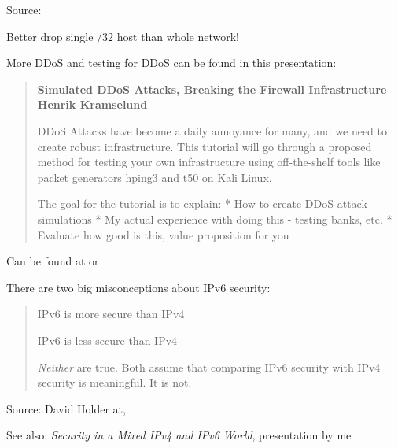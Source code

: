 \documentclass[Screen16to9,17pt]{foils}
\begin{document}
Source:\\
{\footnotesize{}}

\centerline{Better drop single /32 host than whole network!}


More DDoS and testing for DDoS can be found in this presentation:
\begin{quote}\footnotesize{\bf
Simulated DDoS Attacks, Breaking the Firewall Infrastructure
Henrik Kramselund}

DDoS Attacks have become a daily annoyance for many, and we need to create robust infrastructure. This tutorial will go through a proposed method for testing your own infrastructure using off-the-shelf tools like packet generators hping3 and t50 on Kali Linux.

The goal for the tutorial is to explain:
* How to create DDoS attack simulations
* My actual experience with doing this - testing banks, etc.
* Evaluate how good is this, value proposition for you
\end{quote}

{\small Can be found at  or \\
}



There are two big misconceptions about IPv6 security:

\begin{quote}
\begin{list2}
\item IPv6 is more secure than IPv4
\item IPv6 is less secure than IPv4
\end{list2}

\emph{Neither} are true. Both assume that comparing IPv6 security with IPv4 security is meaningful. It is not.
\end{quote}
Source: David Holder at, 


See also:
\emph{Security in a Mixed IPv4 and IPv6 World}, presentation by me\\
\end{document}

